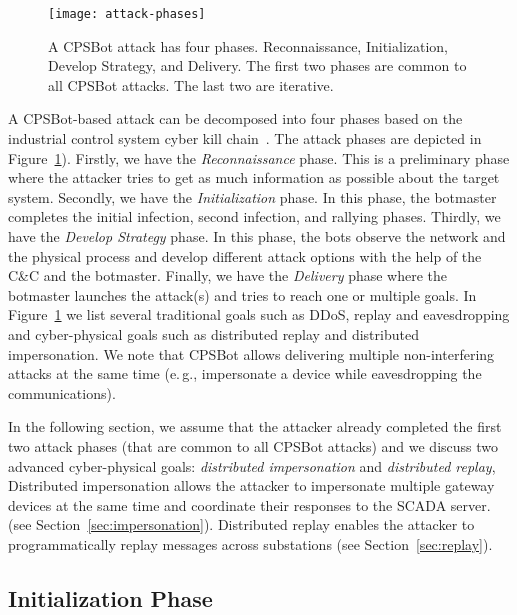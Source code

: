 \documentclass[sigconf]{acmart}
\makeatletter
\newcommand{\eg}{e.\@\,g.,\@\xspace}
\newcommand{\Botnet}{CPSBot\@\xspace}
\newcommand{\CC}{C\&C\@\xspace}
\makeatother
\begin{document}
\begin{figure}[tb]
    \centering
    \texttt{[image: attack-phases]}
    \caption{A \Botnet attack has four phases. Reconnaissance,
    Initialization, Develop Strategy, and Delivery. The first two phases are
    common to all \Botnet attacks. The last two are iterative.}
    \label{fig:dei-phases}
\end{figure}  

A \Botnet-based attack can be decomposed into four phases based on the
industrial control system cyber kill chain~\cite{sans2015icsckc}. The
attack phases are depicted in Figure~\ref{fig:dei-phases}). Firstly, we
have the \emph{Reconnaissance} phase. This is a preliminary phase where
the attacker tries to get as much information as possible about the target
system. Secondly, we have the \emph{Initialization} phase. In this phase, the
botmaster completes the initial infection, second infection, and rallying
phases. Thirdly, we have the \emph{Develop Strategy} phase. In this phase,
the bots observe the network and the physical process and develop different
attack options with the help of the \CC and the botmaster. Finally, we have
the \emph{Delivery} phase where the botmaster launches the attack(s) and tries
to reach one or multiple goals. In Figure~\ref{fig:dei-phases} we list several
traditional goals such as DDoS, replay and eavesdropping and cyber-physical
goals such as distributed replay and distributed impersonation. We note that
\Botnet allows delivering multiple non-interfering attacks at the same time (\eg
impersonate a device while eavesdropping the communications).

In the following section, we assume that the attacker already completed
the first two attack phases (that are common to all \Botnet attacks)
and we discuss two advanced cyber-physical goals: \emph{distributed
impersonation} and \emph{distributed replay}, Distributed impersonation
allows the attacker to impersonate multiple gateway devices at the same time
and coordinate their responses to the SCADA server.
(see Section~\ref{sec:impersonation}). Distributed replay enables the attacker to
programmatically replay messages across substations (see Section~\ref{sec:replay}).



\subsection{Initialization Phase}
\label{sec:init}
\end{document}
